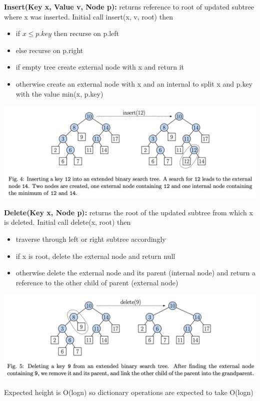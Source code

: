\documentclass{article}
\begin{document}
  \newpage
  \noindent \textbf{Insert(Key x, Value v, Node p): }returns reference to root of updated subtree where x was inserted. Initial call insert(x, v, root) then
  \begin{itemize}
    \item if $x \leq p.key$ then recurse on p.left
    \item else recurse on p.right
    \item if empty tree create external node with x and return it
    \item otherwise create an external node with x and an internal to split x and p.key with the value min(x, p.key)
  \end{itemize}
  \begin{center}
  \includegraphics[scale=0.3]{ExtendedBSTInsert}
  \end{center}
  \textbf{Delete(Key x, Node p): }returns the root of the updated subtree from which x is deleted. Initial call delete(x, root) then
  \begin{itemize}
    \item traverse through left or right subtree accordingly
    \item if x is root, delete the external node and return null
    \item otherwise delete the external node and its parent (internal node) and return a reference to the other child of parent (external node)\\
  \end{itemize}
  \begin{center}
    \includegraphics[scale=0.35]{ExtendedBSTDeletion}
  \end{center}
  Expected height is O(logn) so dictionary operations are expected to take O(logn)
  \newpage
\end{document}
